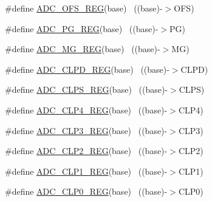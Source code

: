 \begin{DoxyCompactItemize}
\item 
\#define \hyperlink{group___a_d_c___register___accessor___macros_ga4b4fbf29b89f142f123aed9b97f55266}{A\+D\+C\+\_\+\+O\+F\+S\+\_\+\+R\+EG}(base)                                            ~((base)-\/$>$O\+FS)
\item 
\#define \hyperlink{group___a_d_c___register___accessor___macros_ga4d97338d7454f7bdaf0b5167c29729c3}{A\+D\+C\+\_\+\+P\+G\+\_\+\+R\+EG}(base)                                              ~((base)-\/$>$PG)
\item 
\#define \hyperlink{group___a_d_c___register___accessor___macros_ga92ad06b46539182e739c15a332939dbd}{A\+D\+C\+\_\+\+M\+G\+\_\+\+R\+EG}(base)                                              ~((base)-\/$>$MG)
\item 
\#define \hyperlink{group___a_d_c___register___accessor___macros_gabae1662b235397e7a388ff36e00f732e}{A\+D\+C\+\_\+\+C\+L\+P\+D\+\_\+\+R\+EG}(base)                                          ~((base)-\/$>$C\+L\+PD)
\item 
\#define \hyperlink{group___a_d_c___register___accessor___macros_ga482119bbb8a6c40285b6999d6a88d76a}{A\+D\+C\+\_\+\+C\+L\+P\+S\+\_\+\+R\+EG}(base)                                          ~((base)-\/$>$C\+L\+PS)
\item 
\#define \hyperlink{group___a_d_c___register___accessor___macros_ga2722b8710cc4793af32d1ca062749691}{A\+D\+C\+\_\+\+C\+L\+P4\+\_\+\+R\+EG}(base)                                          ~((base)-\/$>$C\+L\+P4)
\item 
\#define \hyperlink{group___a_d_c___register___accessor___macros_gad3369cf8ea89b61e025a00e28e48d878}{A\+D\+C\+\_\+\+C\+L\+P3\+\_\+\+R\+EG}(base)                                          ~((base)-\/$>$C\+L\+P3)
\item 
\#define \hyperlink{group___a_d_c___register___accessor___macros_gaf76097bf0d35aba4eb24772209ca9088}{A\+D\+C\+\_\+\+C\+L\+P2\+\_\+\+R\+EG}(base)                                          ~((base)-\/$>$C\+L\+P2)
\item 
\#define \hyperlink{group___a_d_c___register___accessor___macros_ga17d3db4a239c595d8d2ec4fa8b064106}{A\+D\+C\+\_\+\+C\+L\+P1\+\_\+\+R\+EG}(base)                                          ~((base)-\/$>$C\+L\+P1)
\item 
\#define \hyperlink{group___a_d_c___register___accessor___macros_gafd619a5a2718979bc59f90085ac98c17}{A\+D\+C\+\_\+\+C\+L\+P0\+\_\+\+R\+EG}(base)                                          ~((base)-\/$>$C\+L\+P0)
\item 

\end{DoxyCompactItemize}
